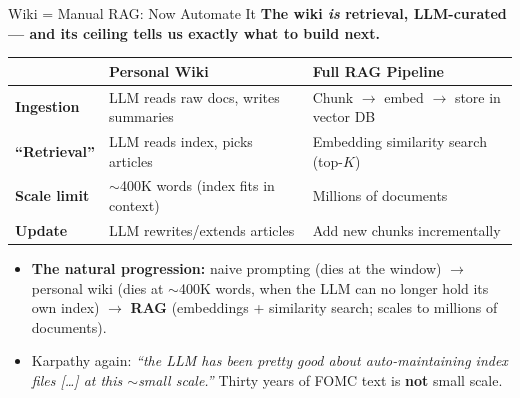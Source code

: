 \begin{frame}{Wiki = Manual RAG: Now Automate It}
\textbf{The wiki \emph{is} retrieval, LLM-curated --- and its ceiling tells us exactly what to build next.}

\smallskip
\begin{center}
\renewcommand{\arraystretch}{1.15}
\begin{tabular}{|p{2.6cm}|p{4.6cm}|p{5.6cm}|}
\hline
& \textbf{Personal Wiki} & \textbf{Full RAG Pipeline} \\
\hline
\textbf{Ingestion} & LLM reads raw docs, writes summaries & Chunk $\to$ embed $\to$ store in vector DB \\
\hline
\textbf{``Retrieval''} & LLM reads index, picks articles & Embedding similarity search (top-$K$) \\
\hline
\textbf{Scale limit} & ${\sim}$400K words (index fits in context) & Millions of documents \\
\hline
\textbf{Update} & LLM rewrites/extends articles & Add new chunks incrementally \\
\hline
\end{tabular}
\end{center}

\smallskip
\begin{itemize}
\item \textbf{The natural progression:} naive prompting (dies at the window) $\to$ personal wiki (dies at ${\sim}$400K words, when the LLM can no longer hold its own index) $\to$ \textbf{RAG} (embeddings + similarity search; scales to millions of documents).

\smallskip
\item Karpathy again: \emph{``the LLM has been pretty good about auto-maintaining index files \textnormal{[\ldots]} at this $\sim$small scale.''} Thirty years of FOMC text is \textbf{not} small scale.
\end{itemize}
\end{frame}

